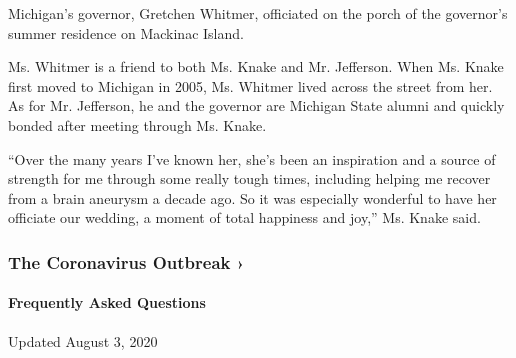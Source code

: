 Michigan's governor, Gretchen Whitmer, officiated on the porch of the
governor's summer residence on Mackinac Island.

Ms. Whitmer is a friend to both Ms. Knake and Mr. Jefferson. When Ms.
Knake first moved to Michigan in 2005, Ms. Whitmer lived across the
street from her. As for Mr. Jefferson, he and the governor are Michigan
State alumni and quickly bonded after meeting through Ms. Knake.

``Over the many years I've known her, she's been an inspiration and a
source of strength for me through some really tough times, including
helping me recover from a brain aneurysm a decade ago. So it was
especially wonderful to have her officiate our wedding, a moment of
total happiness and joy,'' Ms. Knake said.

\href{https://www.nytimes.com/news-event/coronavirus?action=click\&pgtype=Article\&state=default\&region=MAIN_CONTENT_3\&context=storylines_faq}{}

\hypertarget{the-coronavirus-outbreak-}{%
\subsubsection{The Coronavirus Outbreak
›}\label{the-coronavirus-outbreak-}}

\hypertarget{frequently-asked-questions}{%
\paragraph{Frequently Asked
Questions}\label{frequently-asked-questions}}

Updated August 3, 2020


